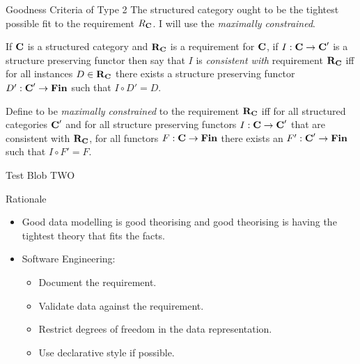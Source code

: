 \documentclass[xcolor=pst,dvips]{beamer}   %
\begin{document}
\begin{frame}{Goodness Criteria of Type 2}
The structured category  ought to be the tightest possible fit to the requirement $R_{\textbf{C}}$.
I will use the  \textit{maximally constrained}.
\begin{definition}
If $\textbf{C}$ is a structured category and $\textbf{R}_{\textbf{C}}$ is a requirement for $\textbf{C}$,  
if $I: \textbf{C} \rightarrow \textbf{C}'$ is a structure preserving functor then 
say that $I$ is \textit{consistent with} requirement $\textbf{R}_{\textbf{C}}$ iff for all instances $D \in \textbf{R}_{\textbf{C}}$ 
there exists a structure preserving functor $D':\textbf{C}' \rightarrow \textbf{Fin}$ such that $I \circ D'=D$.
\end{definition}
\begin{definition}
Define \catcw to be \textit{maximally constrained} to the requirement $\textbf{R}_{\textbf{C}}$ iff 
for all structured categories $\textbf{C}'$ 
and for all structure preserving functors $I:\textbf{C} \rightarrow \textbf{C}'$ that are consistent with $\textbf{R}_{\textbf{C}}$, 
for all functors $F: \textbf{C} \rightarrow \textbf{Fin}$  there exists an $F' : \textbf{C}' \rightarrow \textbf{Fin}$ such that $I \circ F'=F$.
\end{definition}
\end{frame}


\begin{frame}{Test}
Blob TWO
\end{frame}

\begin{frame}{Rationale}
\begin{itemize}
\item Good data modelling is good theorising and good theorising is having the tightest theory that fits the facts.
\item Software Engineering: 
\begin{itemize}
\item Document the requirement.
\item Validate data against the requirement. 
\item Restrict degrees of freedom in the data representation.
\item Use declarative style if possible.
\end{itemize}
\end{itemize}
\end{frame}
\end{document}
